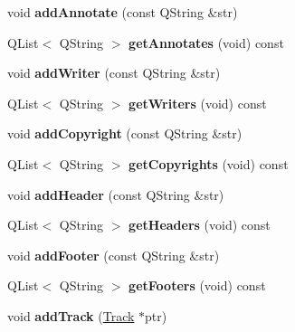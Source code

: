 \begin{DoxyCompactItemize}
void {\bfseries add\+Annotate} (const Q\+String \&str)
\item 
\mbox{\label{class_o_v_e_1_1_ove_song_addcfa56ed287b8b4a4808a531a9f3279}} 
Q\+List$<$ Q\+String $>$ {\bfseries get\+Annotates} (void) const
\item 
\mbox{\label{class_o_v_e_1_1_ove_song_a3c68e07db59591208c6fa1afdb522c6f}} 
void {\bfseries add\+Writer} (const Q\+String \&str)
\item 
\mbox{\label{class_o_v_e_1_1_ove_song_a466ac155b4843a26b0493336f7f8f7da}} 
Q\+List$<$ Q\+String $>$ {\bfseries get\+Writers} (void) const
\item 
\mbox{\label{class_o_v_e_1_1_ove_song_a365a1cb535f77945567851c36911decd}} 
void {\bfseries add\+Copyright} (const Q\+String \&str)
\item 
\mbox{\label{class_o_v_e_1_1_ove_song_a7c2f745002fc6242fd7dec2c66b74e46}} 
Q\+List$<$ Q\+String $>$ {\bfseries get\+Copyrights} (void) const
\item 
\mbox{\label{class_o_v_e_1_1_ove_song_a7c76f040bc3b3c3ce14504b6fcf931c7}} 
void {\bfseries add\+Header} (const Q\+String \&str)
\item 
\mbox{\label{class_o_v_e_1_1_ove_song_ac1a51c78ae1e8741de6ef8558596f8ca}} 
Q\+List$<$ Q\+String $>$ {\bfseries get\+Headers} (void) const
\item 
\mbox{\label{class_o_v_e_1_1_ove_song_aed89a22d3d96540ef9e20a938d21719d}} 
void {\bfseries add\+Footer} (const Q\+String \&str)
\item 
\mbox{\label{class_o_v_e_1_1_ove_song_afa1298277598f3b5ae51fa12b37923bd}} 
Q\+List$<$ Q\+String $>$ {\bfseries get\+Footers} (void) const
\item 
\mbox{\label{class_o_v_e_1_1_ove_song_a2a50257f7c3a781c6caf1fd47c2f3866}} 
void {\bfseries add\+Track} (\hyperlink{class_o_v_e_1_1_track}{Track} $\ast$ptr)

\end{DoxyCompactItemize}

